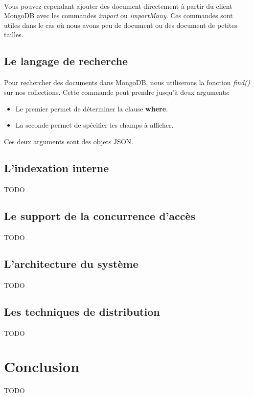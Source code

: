 \documentclass{article}
\begin{document}
  \paragraph{} Vous pouvez cependant ajouter des document directement à partir
  du client MongoDB avec les commandes \emph{import} ou \emph{importMany}.
  Ces commandes sont utiles dans le cas où nous avons peu de document ou des
  document de petites tailles.
  
\subsection{Le langage de recherche}
  \paragraph{} Pour rechercher des documents dans MongoDB, nous utiliserons la 
  fonction \emph{find()} sur nos collections. Cette commande peut prendre jusqu'à
  deux arguments:
  \begin{itemize}
    \item Le premier permet de déterminer la clause \textbf{where}.
    \item La seconde permet de spécifier les champs à afficher.
  \end{itemize} 
  Ces deux arguments sont des objets JSON.
\subsection{L’indexation interne}
  \paragraph{} TODO
\subsection{Le support de la concurrence d’accès}
  \paragraph{} TODO
\subsection{L’architecture du système}
  \paragraph{} TODO
\subsection{Les techniques de distribution}
  \paragraph{} TODO


\section{Conclusion}
  \paragraph{} TODO
  
\end{document}

